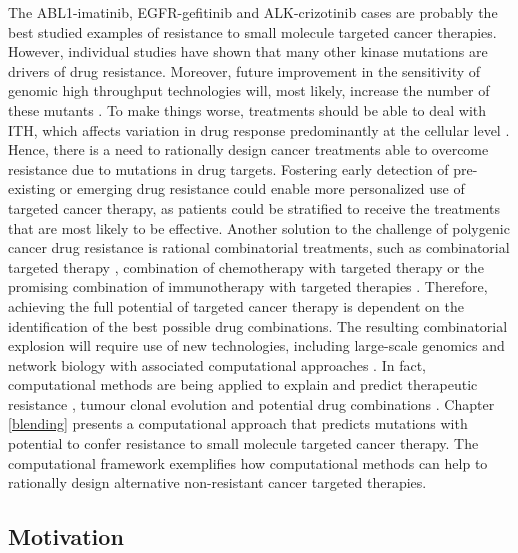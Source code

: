 \documentclass[11pt, b5paper,twoside]{tesi_upf}
\begin{document}
\par The ABL1-imatinib, EGFR-gefitinib and ALK-crizotinib cases are probably the best studied examples of resistance to small molecule targeted cancer therapies. However, individual studies have shown that many other kinase mutations are drivers of drug resistance. Moreover, future improvement in the sensitivity of genomic high throughput technologies will, most likely, increase the number of these mutants \cite{Schmitt2015}. To make things worse, treatments should be able to deal with ITH, which affects variation in drug response predominantly at the cellular level \cite{Burrell2014}. Hence, there is a need to rationally design cancer treatments able to overcome resistance due to mutations in drug targets. Fostering early detection of pre-existing or emerging drug resistance could enable more personalized use of targeted cancer therapy, as patients could be stratified to receive the treatments that are most likely to be effective. Another solution to the challenge of polygenic cancer drug resistance is rational combinatorial treatments, such as combinatorial targeted therapy \cite{Flaherty2012}, combination of chemotherapy with targeted therapy \cite{Cortes2016} or the promising combination of immunotherapy with targeted therapies \cite{Vanneman2012}. Therefore, achieving the full potential of targeted cancer therapy is dependent on the identification of the best possible drug combinations. The resulting combinatorial explosion will require use of new technologies, including large-scale genomics and network biology with associated computational approaches \cite{Al-Lazikani2012}. In fact, computational methods are being applied to explain and predict therapeutic resistance \cite{Bozic2013, Komarova2014}, tumour clonal evolution \cite{Williams2016, Attolini2010} and potential drug combinations \cite{Chmielecki2011, Huang2007}. Chapter \ref{blending} presents a computational approach that predicts mutations with potential to confer resistance to small molecule targeted cancer therapy. The computational framework exemplifies how computational methods can help to rationally design alternative non-resistant cancer targeted therapies. 

 
\subsection{Motivation}
\end{document}
